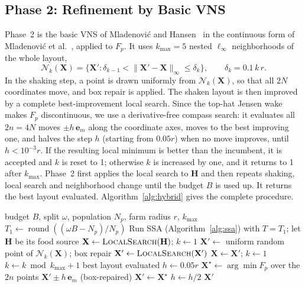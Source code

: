 \documentclass[journal,twoside]{IEEEtran}
\begin{document}
\subsection{Phase 2: Refinement by Basic VNS}
Phase~2 is the basic VNS of Mladenovi\'c and Hansen~\cite{Mladenovic1997,Hansen2001} in the continuous form of Mladenovi\'c et al.~\cite{Mladenovic2008}, applied to $F_p$. It uses $k_{\max}=5$ nested $\ell_\infty$ neighborhoods of the whole layout,
\[
\mathcal N_k(\mathbf X)=\{\mathbf X':\delta_{k-1}<\lVert \mathbf X'-\mathbf X\rVert_\infty\le\delta_k\},\qquad \delta_k=0.1\,k\,r .
\]
In the shaking step, a point is drawn uniformly from $\mathcal N_k(\mathbf X)$, so that all $2N$ coordinates move, and box repair is applied. The shaken layout is then improved by a complete best-improvement local search. Since the top-hat Jensen wake makes $F_p$ discontinuous, we use a derivative-free compass search: it evaluates all $2n=4N$ moves $\pm h\,\mathbf e_m$ along the coordinate axes, moves to the best improving one, and halves the step $h$ (starting from $0.05r$) when no move improves, until $h<10^{-3}r$. If the resulting local minimum is better than the incumbent, it is accepted and $k$ is reset to 1; otherwise $k$ is increased by one, and it returns to 1 after $k_{\max}$. Phase~2 first applies the local search to $\mathbf H$ and then repeats shaking, local search and neighborhood change until the budget $B$ is used up. It returns the best layout evaluated. Algorithm~\ref{alg:hybrid} gives the complete procedure.

\begin{algorithm}[!t]
\caption{SSA-VNS for a prescribed turbine count $N$}
\label{alg:hybrid}
\begin{algorithmic}[1]
\Require budget $B$, split $\omega$, population $N_p$, farm radius $r$, $k_{\max}$
\State $T_1\gets\operatorname{round}((\omega B-N_p)/N_p)$
\State Run SSA (Algorithm~\ref{alg:ssa}) with $T=T_1$; let $\mathbf H$ be its food source
\State $\mathbf X\gets\textsc{LocalSearch}(\mathbf H)$; $k\gets1$
    \State $\mathbf X'\gets$ uniform random point of $\mathcal N_k(\mathbf X)$; box repair
    \State $\mathbf X'\gets\textsc{LocalSearch}(\mathbf X')$
        \State $\mathbf X\gets \mathbf X'$; $k\gets1$
    \Else
        \State $k\gets k\bmod k_{\max}+1$
    \EndIf
\EndWhile
\State \Return best layout evaluated
\Statex
{} 
    \State $h\gets0.05r$
        \State $\mathbf X^\star\gets\arg\min F_p$ over the $2n$ points $\mathbf X'\pm h\,\mathbf e_m$ (box-repaired)
         \State $\mathbf X'\gets \mathbf X^\star$ \Else \State $h\gets h/2$ \EndIf
    \EndWhile
    \State \Return $\mathbf X'$
\EndFunction
\end{algorithmic}
\end{algorithm}
\end{document}
